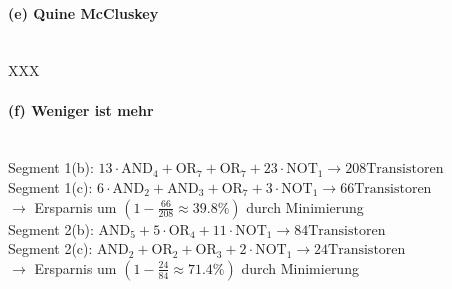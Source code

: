 \documentclass[a4paper]{article}
\begin{document}
\paragraph{(e) Quine McCluskey}\mbox{}\\
XXX

\paragraph{(f) Weniger ist mehr}\mbox{}\\
Segment 1(b): $13\cdot\text{AND}_4 + \text{OR}_7 + \text{OR}_7 + 23\cdot\text{NOT}_1 \rightarrow 208\text{Transistoren}$\\
Segment 1(c): $6\cdot\text{AND}_2 + \text{AND}_3 + \text{OR}_7 + 3\cdot\text{NOT}_1 \rightarrow 66\text{Transistoren}$\\
$\rightarrow$ Ersparnis um $(1-\frac{66}{208}\approx39.8\%)$ durch Minimierung\\
Segment 2(b): $\text{AND}_5 + 5\cdot\text{OR}_4 + 11\cdot\text{NOT}_1 \rightarrow 84\text{Transistoren}$\\
Segment 2(c): $\text{AND}_2 + \text{OR}_2 + \text{OR}_3 + 2\cdot\text{NOT}_1 \rightarrow 24\text{Transistoren}$\\
$\rightarrow$ Ersparnis um $(1-\frac{24}{84}\approx71.4\%)$ durch Minimierung\\
\end{document}
